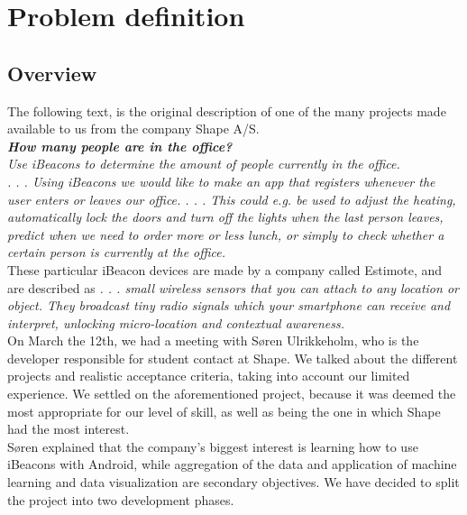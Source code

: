 \documentclass[12pt]{article}
\begin{document}
\newpage
\section{Problem definition}

\subsection{Overview}

The following text, is the original description of one of the many projects made available to us from the company Shape A/S.\\

\textit{\textbf{How many people are in the office?}\\
Use iBeacons to determine the amount of people currently in the office. \\
. . .
Using iBeacons we would like to make an app that registers whenever the user enters or leaves our office. . . . This could e.g. be used to adjust the heating, automatically lock the doors and turn off the lights when the last person leaves, predict when we need to order more or less lunch, or simply to check whether a certain person is currently at the office.} \cite{shape_ws}\\

These particular iBeacon devices are made by a company called Estimote, and are described as \textit{. . . small wireless sensors that you can attach to any location or object. They broadcast tiny radio signals which your smartphone can receive and interpret, unlocking micro-location and contextual awareness.} \cite{estimote_ws}\\

On March the 12th, we had a meeting with S\o ren Ulrikkeholm, who is the developer responsible for student contact at Shape. We talked about the different projects and realistic acceptance criteria, taking into account our limited experience. We settled on the aforementioned project, because it was deemed the most appropriate for our level of skill, as well as being the one in which Shape had the most interest.\\

S\o ren explained that the company's biggest interest is learning how to use iBeacons with Android, while aggregation of the data and application of machine learning and data visualization are secondary objectives. We have decided to split the project into two development phases.\\
\end{document}
